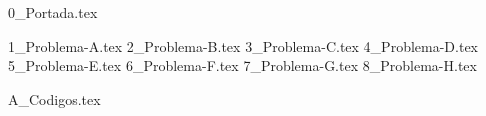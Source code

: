 \documentclass[a4paper,12pt,twoside]{all-in-one} %
\begin{document}

{0_Portada.tex}
{
  \hypersetup{hidelinks}
  \tableofcontents
}
\clearpage

{1_Problema-A.tex}
\clearpage
{2_Problema-B.tex}
\clearpage
{3_Problema-C.tex}
\clearpage
{4_Problema-D.tex}
\clearpage
{5_Problema-E.tex}
\clearpage
{6_Problema-F.tex}
\clearpage
{7_Problema-G.tex}
\clearpage
{8_Problema-H.tex}
\clearpage

\clearpage
\appendix
{A_Codigos.tex}

\clearpage
\pagestyle{\auxsettings}
\printbibliography[heading=bibintoc]
\end{document}
